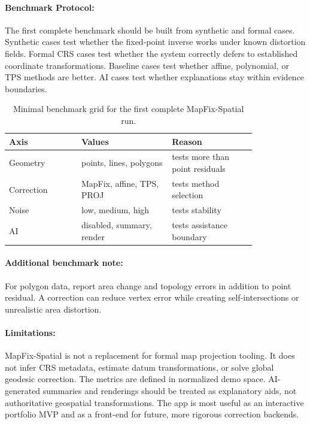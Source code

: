 \documentclass{article}
\begin{document}
\paragraph{Benchmark Protocol:}

The first complete benchmark should be built from synthetic and formal cases. Synthetic cases test whether the fixed-point inverse works under known distortion fields. Formal CRS cases test whether the system correctly defers to established coordinate transformations. Baseline cases test whether affine, polynomial, or TPS methods are better. AI cases test whether explanations stay within evidence boundaries.

\begin{table}[t]
\centering
\caption{Minimal benchmark grid for the first complete MapFix-Spatial run.}
\begin{tabular}{@{}p{0.24\linewidth}p{0.30\linewidth}p{0.28\linewidth}@{}}
\toprule
\textbf{Axis} & \textbf{Values} & \textbf{Reason}\\
\midrule
Geometry & points, lines, polygons & tests more than point residuals\\
Correction & MapFix, affine, TPS, PROJ & tests method selection\\
Noise & low, medium, high & tests stability\\
AI & disabled, summary, render & tests assistance boundary\\
\bottomrule
\end{tabular}
\end{table}

\paragraph{Additional benchmark note:}

For polygon data, report area change and topology errors in addition to point residual. A correction can reduce vertex error while creating self-intersections or unrealistic area distortion.

\paragraph{Limitations:}

MapFix-Spatial is not a replacement for formal map projection tooling. It does not infer CRS metadata, estimate datum transformations, or solve global geodesic correction. The metrics are defined in normalized demo space. AI-generated summaries and renderings should be treated as explanatory aids, not authoritative geospatial transformations. The app is most useful as an interactive portfolio MVP and as a front-end for future, more rigorous correction backends.
\end{document}
